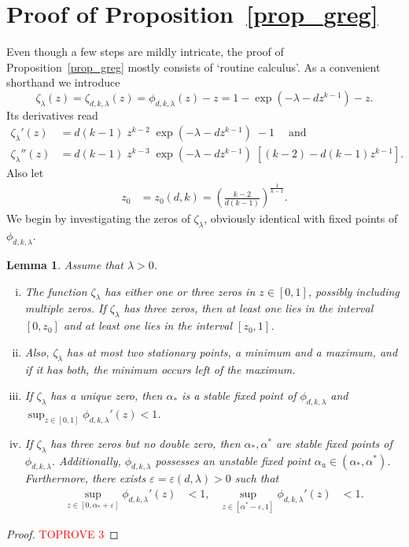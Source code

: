 \documentclass[10pt,reqno]{amsart}
\newcommand\mk[1]{\textcolor{cyan}{#1}}
\renewcommand\mk[1]{#1}
\numberwithin{equation}{section}
\newcommand\eps{\varepsilon}
\newcommand\bc[1]{\left({#1}\right)}
\newcommand\Prop{Proposition}
\newtheorem{lemma}[definition]{Lemma}
\newcommand{\ph}{\phi_{d,k,\lambda}}
\newcommand{\zt}{\zeta_\lambda}
\newcommand{\expld}{\exp(-\lambda-d z^{k-1})}
\begin{document}
\section{Proof of \Prop~\ref{prop_greg}}\label{sec_greg}

\noindent
Even though a few steps are mildly intricate, the proof of \Prop~\ref{prop_greg} mostly consists of `routine calculus'.
As a convenient shorthand we introduce $$\zeta_\lambda(z)=\zeta_{d,k,\lambda}(z)=\phi_{d,k,\lambda}(z)-z = \mk{1-\exp\bc{-\lambda -d z^{k-1}} - z}.$$
Its derivatives read
\begin{align}
\zt'(z)  
 &=d(k-1)  \; z^{k-2} \;  \expld
 \; -1   \;
 \label{zt'}
\quad\text{and} \\
\zt''(z)
&=
  d (k-1) \; z^{k-3} \; \expld \; 
  \left[  (k-2) - d(k-1) z^{k-1} \right] .
\label{zt''}
\end{align}
Also let
\begin{align}\label{inflection}
    z_0 &= z_0(d,k) = \left(\frac{k-2}{d(k-1)}\right)^{\frac{1}{{k-1}}}. 
\end{align}
We begin by investigating the zeros of $\zt$, obviously identical with fixed points of $\ph$.

\begin{lemma} \label{Claim13}
	Assume that $\lambda>0$.
	\begin{enumerate}[(i)]
		\item The function $\zt$ has either one or three zeros in $z \in [0,1]$, possibly including multiple zeros.
			If $\zt$ has three zeros, then at least one lies in the interval $[0,z_0]$ and at least one lies in the interval $[z_0,1]$.
		\item Also, $\zt$ has at most two stationary points, a minimum and a maximum, and if it has both, the minimum occurs left of the maximum.
		\item If $\zt$ has a unique zero, then $\alpha_*$ is a stable fixed point of $\ph$ and $\sup_{z\in[0,1]}\ph'(z)<1$.
		\item If $\zt$ has three zeros but no double zero, then $\alpha_*,\alpha^*$ are stable fixed points of $\ph$. Additionally, $\ph$ possesses an unstable fixed point $\alpha_\mathrm{u}\in(\alpha_*,\alpha^*)$.
			Furthermore, there exists $\eps=\eps(d,\lambda)>0$ such that
			\begin{align*}
				\sup_{z\in[0,\alpha_*+\eps]}\ph'(z)&<1,&\sup_{z\in[\alpha^*-\eps,1]}\ph'(z)&<1.
			\end{align*}
	\end{enumerate}
\end{lemma}
\begin{proof}\textcolor{red}{TOPROVE 3}\end{proof}
\end{document}
